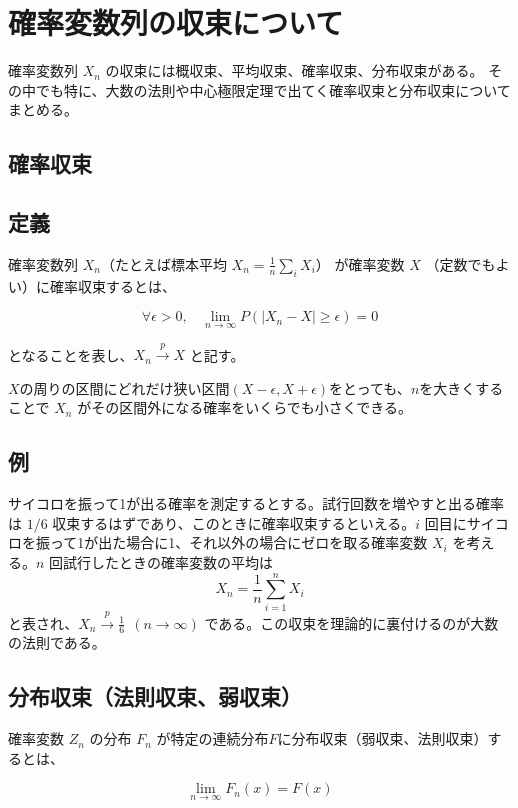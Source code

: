 \documentclass[10pt, a4paper]{ltjsarticle}
\begin{document}
\section{確率変数列の収束について}

確率変数列 $X_n$ の収束には概収束、平均収束、確率収束、分布収束がある。
その中でも特に、大数の法則や中心極限定理で出てく確率収束と分布収束についてまとめる。

\subsection{確率収束}

\subsection{定義}

確率変数列 $X_n$（たとえば標本平均 $X_n = \frac{1}{n}\sum_i X_i$） が確率変数 $X$ （定数でもよい）に確率収束するとは、

\begin{equation}
\forall\epsilon>0,~~~~\lim_{n\to\infty}P(|X_n - X| \geq\epsilon) = 0 
\end{equation}

となることを表し、$X_n \xrightarrow{p} X$ と記す。

$X$の周りの区間にどれだけ狭い区間$(X-\epsilon, X+\epsilon)$をとっても、$n$を大きくすることで $X_n$ がその区間外になる確率をいくらでも小さくできる。

\subsection{例}

サイコロを振って1が出る確率を測定するとする。試行回数を増やすと出る確率は $1/6$ 収束するはずであり、このときに確率収束するといえる。$i$ 回目にサイコロを振って1が出た場合に1、それ以外の場合にゼロを取る確率変数 $X_i$ を考える。$n$ 回試行したときの確率変数の平均は
$$
X_n = \frac{1}{n}\sum_{i=1}^n X_i
$$
と表され、$X_n \xrightarrow{p} \frac{1}{6}~~(n\to\infty)$ である。この収束を理論的に裏付けるのが大数の法則である。


\subsection{分布収束（法則収束、弱収束）}

確率変数 $Z_n$ の分布 $F_n$ が特定の連続分布$F$に分布収束（弱収束、法則収束）するとは、

\begin{equation}
\lim_{n\to\infty} F_n(x) = F(x)
\end{equation}
\end{document}
